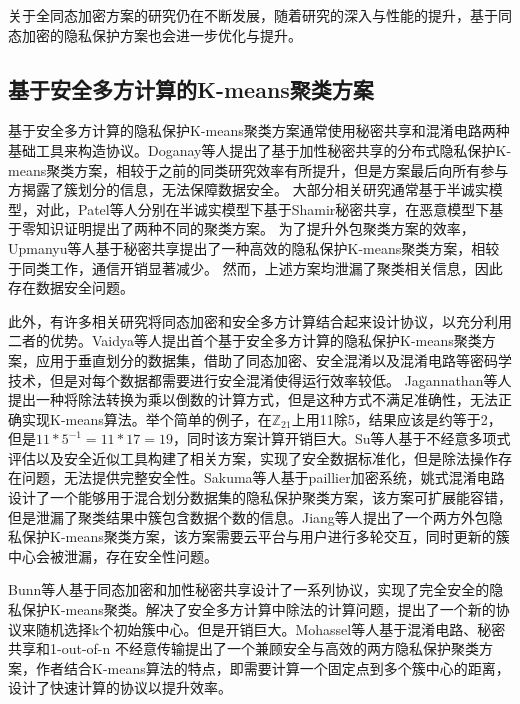 关于全同态加密方案的研究仍在不断发展，随着研究的深入与性能的提升，基于同态加密的隐私保护方案也会进一步优化与提升。

\subsection{基于安全多方计算的K-means聚类方案}
基于安全多方计算的隐私保护K-means聚类方案通常使用秘密共享和混淆电路两种基础工具来构造协议。Doganay等人\cite{doganay2008distributed}提出了基于加性秘密共享的分布式隐私保护K-means聚类方案，相较于之前的同类研究效率有所提升，但是方案最后向所有参与方揭露了簇划分的信息，无法保障数据安全。
大部分相关研究通常基于半诚实模型，对此，Patel等人\cite{patel2012efficient,patel2013privacy}分别在半诚实模型下基于Shamir秘密共享，在恶意模型下基于零知识证明提出了两种不同的聚类方案。
为了提升外包聚类方案的效率，Upmanyu等人\cite{upmanyu2010efficient}基于秘密共享提出了一种高效的隐私保护K-means聚类方案，相较于同类工作，通信开销显著减少。
然而，上述方案均泄漏了聚类相关信息，因此存在数据安全问题\cite{hegde2021sok}。

此外，有许多相关研究将同态加密和安全多方计算结合起来设计协议，以充分利用二者的优势。Vaidya等人\cite{vaidya2003privacy}提出首个基于安全多方计算的隐私保护K-means聚类方案\cite{meskine2012privacy}，应用于垂直划分的数据集，借助了同态加密、安全混淆\cite{du2001privacy}以及混淆电路等密码学技术，但是对每个数据都需要进行安全混淆使得运行效率较低。
Jagannathan等人\cite{jagannathan2005privacy}提出一种将除法转换为乘以倒数的计算方式，但是这种方式不满足准确性，无法正确实现K-means算法。举个简单的例子，在$\mathbb{Z}_{21}$上用11除5，结果应该是约等于2，但是$11*5^{-1}=11*17=19$，同时该方案计算开销巨大\cite{bunn2007secure}。Su等人\cite{su2007privacy}基于不经意多项式评估以及安全近似工具构建了相关方案，实现了安全数据标准化，但是除法操作存在问题，无法提供完整安全性。Sakuma等人\cite{sakuma2010large}基于paillier加密系统，姚式混淆电路设计了一个能够用于混合划分数据集的隐私保护聚类方案，该方案可扩展能容错，但是泄漏了聚类结果中簇包含数据个数的信息。Jiang等人\cite{jiang2020efficient}提出了一个两方外包隐私保护K-means聚类方案，该方案需要云平台与用户进行多轮交互，同时更新的簇中心会被泄漏，存在安全性问题。

Bunn等人\cite{bunn2007secure}基于同态加密和加性秘密共享设计了一系列协议，实现了完全安全的隐私保护K-means聚类。解决了安全多方计算中除法的计算问题，提出了一个新的协议来随机选择k个初始簇中心。但是开销巨大。Mohassel等人\cite{mohassel2019practical}基于混淆电路、秘密共享和1-out-of-n 不经意传输提出了一个兼顾安全与高效的两方隐私保护聚类方案，作者结合K-means算法的特点，即需要计算一个固定点到多个簇中心的距离，设计了快速计算的协议以提升效率。

